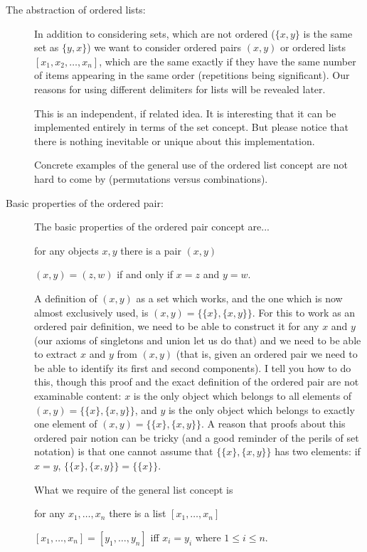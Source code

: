 \documentclass[12pt]{article}
\begin{document}
\begin{description}
\item[The abstraction of ordered lists:]

In addition to considering sets, which are not ordered ($\{x,y\}$ is the same set as $\{y,x\}$) we want to consider
ordered pairs $(x,y)$ or ordered lists $[x_1,x_2,\ldots,x_n]$, which are the same exactly if they have the same number of items appearing in the same order (repetitions being significant).  Our reasons for using different delimiters for lists will be revealed later.

This is an independent, if related idea.  It is interesting that it can be implemented entirely in terms of the set concept.  But please notice that there is nothing inevitable or unique about this implementation.

Concrete examples of the general use of the ordered list concept are not hard to come by (permutations versus combinations).

\item[Basic properties of the ordered pair:]

The basic properties of the ordered pair concept are...

for any objects $x,y$ there is a pair $(x,y)$

$(x,y) = (z,w)$ if and only if $x=z$ and $y=w$.

A definition of $(x,y)$ as a set which works, and the one which is now almost exclusively used, is $(x,y) = \{\{x\},\{x,y\}\}$.  For this to work as an ordered pair definition, we
need to be able to construct it for any $x$ and $y$ (our axioms of singletons and union let us do that) and we need to be able to extract $x$ and $y$ from $(x,y)$ (that is, given an ordered pair we need to be able to identify its first and second components).  I tell you how to do this, though this proof and the exact definition of the ordered pair are not examinable content:  $x$ is the only object which belongs to all  elements of $(x,y) = \{\{x\},\{x,y\}\}$, and
$y$ is the only object which belongs to exactly one element of $(x,y) = \{\{x\},\{x,y\}\}$.  A reason that proofs about this ordered pair notion can be tricky (and a good reminder of the perils of set notation) is that one cannot assume that $\{\{x\},\{x,y\}\}$ has two elements:  if $x=y$, $\{\{x\},\{x,y\}\}= \{\{x\}\}$.

What we require of the general list concept is

for any $x_1,\ldots,x_n$ there is a list $[x_1,\ldots,x_n]$

$[x_1,\ldots,x_n] = [y_1,\ldots,y_n]$ iff $x_i = y_i$ where $1 \leq i \leq n$.


\end{description}
\end{document}
